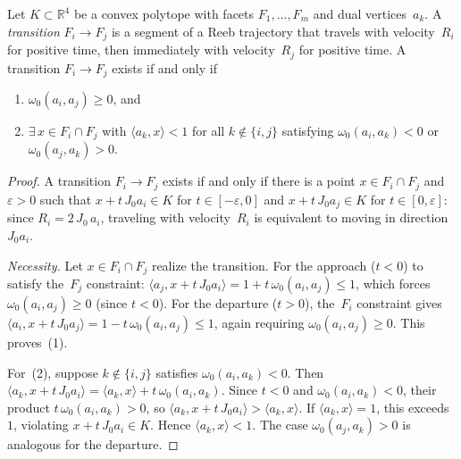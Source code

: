 \begin{unverified}
\begin{lemma}%
\label{lem:numerical-transition-feasibility}
Let $K \subset \mathbb{R}^4$ be a convex polytope with
facets $F_1, \ldots, F_m$ and dual vertices~$a_k$.
A \emph{transition} $F_i \to F_j$ is a segment of a
Reeb trajectory that travels with velocity~$R_i$
for positive time,
then immediately with velocity~$R_j$ for positive time.
A transition $F_i \to F_j$ exists if and only if
\begin{enumerate}
\item $\omega_0(a_i, a_j) \ge 0$, and
\item $\exists\, x \in F_i \cap F_j$ with
  $\langle a_k, x \rangle < 1$
  for all $k \notin \{i,j\}$ satisfying
  $\omega_0(a_i, a_k) < 0$ or
  $\omega_0(a_j, a_k) > 0$.
\end{enumerate}
\end{lemma}

\begin{proof}
A transition $F_i \to F_j$ exists if and only if
there is a point $x \in F_i \cap F_j$ and
$\varepsilon > 0$ such that
$x + t\, J_0 a_i \in K$ for $t \in [-\varepsilon, 0]$
and $x + t\, J_0 a_j \in K$ for $t \in [0, \varepsilon]$:
since $R_i = 2\, J_0\, a_i$,
traveling with velocity~$R_i$ is equivalent to
moving in direction~$J_0 a_i$.

\emph{Necessity.}
Let $x \in F_i \cap F_j$ realize the transition.
For the approach ($t < 0$) to satisfy
the~$F_j$ constraint:
$\langle a_j, x + t\, J_0 a_i \rangle
= 1 + t\,\omega_0(a_i, a_j) \leq 1$,
which forces $\omega_0(a_i, a_j) \geq 0$
(since $t < 0$).
For the departure ($t > 0$), the~$F_i$ constraint gives
$\langle a_i, x + t\, J_0 a_j \rangle
= 1 - t\,\omega_0(a_i, a_j) \leq 1$,
again requiring $\omega_0(a_i, a_j) \geq 0$.
This proves~(1).

For~(2), suppose $k \notin \{i,j\}$ satisfies
$\omega_0(a_i, a_k) < 0$.
Then
$\langle a_k, x + t\, J_0 a_i \rangle
= \langle a_k, x \rangle + t\,\omega_0(a_i, a_k)$.
Since $t < 0$ and $\omega_0(a_i, a_k) < 0$,
their product $t\,\omega_0(a_i, a_k) > 0$, so
$\langle a_k, x + t\, J_0 a_i \rangle
> \langle a_k, x \rangle$.
If $\langle a_k, x \rangle = 1$, this
exceeds~$1$, violating $x + t\, J_0 a_i \in K$.
Hence $\langle a_k, x \rangle < 1$.
The case $\omega_0(a_j, a_k) > 0$ is analogous
for the departure.


\end{proof}
\end{unverified}
